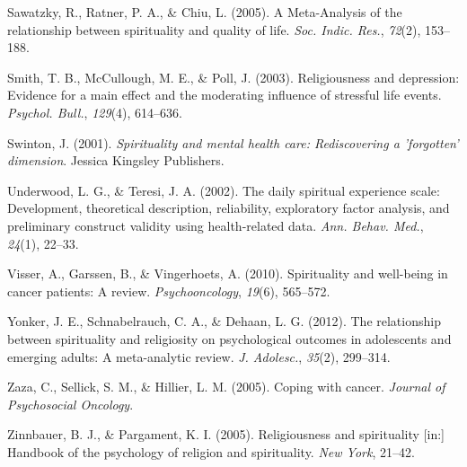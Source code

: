 \documentclass[
  english,
  man]{apa6}
\begin{document}
\leavevmode\hypertarget{ref-Sawatzky2005-rw}{}%
Sawatzky, R., Ratner, P. A., \& Chiu, L. (2005). A Meta-Analysis of the relationship between spirituality and quality of life. \emph{Soc. Indic. Res.}, \emph{72}(2), 153--188.

\leavevmode\hypertarget{ref-Smith2003-re}{}%
Smith, T. B., McCullough, M. E., \& Poll, J. (2003). Religiousness and depression: Evidence for a main effect and the moderating influence of stressful life events. \emph{Psychol. Bull.}, \emph{129}(4), 614--636.

\leavevmode\hypertarget{ref-Swinton2001-vr}{}%
Swinton, J. (2001). \emph{Spirituality and mental health care: Rediscovering a 'forgotten' dimension}. Jessica Kingsley Publishers.

\leavevmode\hypertarget{ref-Underwood2002-hg}{}%
Underwood, L. G., \& Teresi, J. A. (2002). The daily spiritual experience scale: Development, theoretical description, reliability, exploratory factor analysis, and preliminary construct validity using health-related data. \emph{Ann. Behav. Med.}, \emph{24}(1), 22--33.

\leavevmode\hypertarget{ref-Visser2010-kq}{}%
Visser, A., Garssen, B., \& Vingerhoets, A. (2010). Spirituality and well-being in cancer patients: A review. \emph{Psychooncology}, \emph{19}(6), 565--572.

\leavevmode\hypertarget{ref-Yonker2012-zg}{}%
Yonker, J. E., Schnabelrauch, C. A., \& Dehaan, L. G. (2012). The relationship between spirituality and religiosity on psychological outcomes in adolescents and emerging adults: A meta-analytic review. \emph{J. Adolesc.}, \emph{35}(2), 299--314.

\leavevmode\hypertarget{ref-Zaza2005-ac}{}%
Zaza, C., Sellick, S. M., \& Hillier, L. M. (2005). Coping with cancer. \emph{Journal of Psychosocial Oncology}.

\leavevmode\hypertarget{ref-Zinnbauer2005-vz}{}%
Zinnbauer, B. J., \& Pargament, K. I. (2005). Religiousness and spirituality {[}in:{]} Handbook of the psychology of religion and spirituality. \emph{New York}, 21--42.

\endgroup
\end{document}
